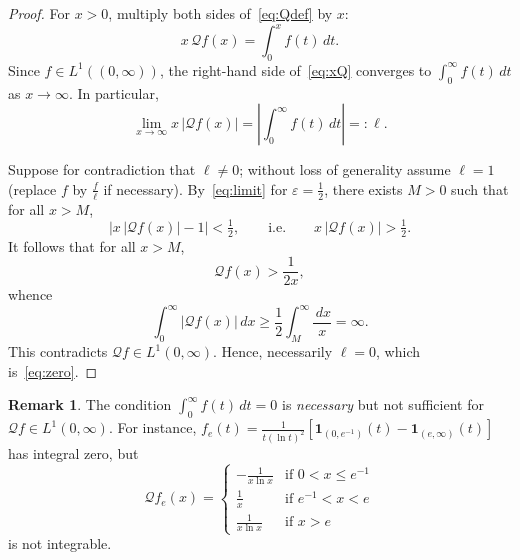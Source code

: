 \documentclass[12pt,a4paper]{amsart}
\theoremstyle{definition}
\newtheorem{remark}[theorem]{Remark}
\newcommand{\Lp}[1]{L^{#1}(0,\infty)}
\newcommand{\dt}{\,dt}
\newcommand{\dx}{\,dx}
\begin{document}
\begin{proof}
For $x>0$, multiply both sides of~\eqref{eq:Qdef} by $x$:
\begin{equation}\label{eq:xQ}
  x\,\mathcal{Q}f(x) = \int_0^{x} f(t)\dt.
\end{equation}
Since $f\in L^{1}((0,\infty))$, the right-hand side of~\eqref{eq:xQ}
converges to $\int_0^\infty f(t)\dt$ as $x\to \infty$.  In particular,
\begin{equation}\label{eq:limit}
  \lim_{x\to \infty} x\,\vert\mathcal{Q}f(x)\vert = \left\vert\int_0^{\infty} f(t)\dt\right\vert =: \ell.
\end{equation}

Suppose for contradiction that $\ell\ne 0$; without loss of generality
assume $\ell = 1$ (replace $f$ by $\frac{f}{\ell}$ if necessary).
By~\eqref{eq:limit} for $\varepsilon = \tfrac{1}{2}$, there exists
$M>0$ such that for all $x>M$,
\[
  \bigl|x\,\vert\mathcal{Q}f(x)\vert - 1\bigr| < \tfrac{1}{2},
  \qquad\text{i.e.}\qquad
  x\,\vert\mathcal{Q}f(x)\vert > \tfrac{1}{2} .
\]
It follows that for all $x>M$,
\begin{equation}\label{eq:lbnd}
  \mathcal{Q}f(x) > \frac{1}{2x},
\end{equation}
whence
\[
  \int_0^\infty \vert\mathcal{Q}f(x)\vert\dx \ge \frac{1}{2}\int_M^\infty \frac{\dx}{x} = \infty.
\]
This contradicts $\mathcal{Q}f\in\Lp{1}$.  Hence, necessarily $\ell=0$,
which is~\eqref{eq:zero}.
\end{proof}

\begin{remark}
The condition $\int_0^\infty f(t)\dt=0$ is \emph{necessary} but not
sufficient for $\mathcal{Q}f\in\Lp{1}$. For instance,
$f_e(t)=\frac{1}{t(\ln t)^2}\left[\mathbf{1}_{(0,e^{-1})}(t)-\mathbf{1}_{(e,\infty)}(t)\right]$ has integral zero,
but \begin{equation*}
\mathcal{Q}f_e(x) = 
\begin{cases} 
      -\frac{1}{x\ln x} & \text{if } 0<x\leq e^{-1} \\
      \frac{1}{x}  & \text{if }  e^{-1}<x<e \\
      \frac{1}{x\ln x} & \text{if } x> e
\end{cases}
\end{equation*}
is not integrable.
\end{remark}
\end{document}
